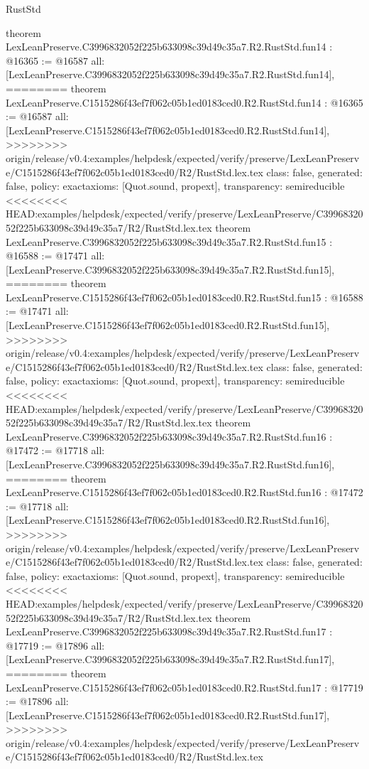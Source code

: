 \begin{lexlean}{RustStd}
\begin{coremodule}
{\begin{coremodule}
{{{{{{{{{{{{{{{{theorem LexLeanPreserve.C3996832052f225b633098c39d49c35a7.R2.RustStd.fun14 : @16365 := @16587 {
  all: [LexLeanPreserve.C3996832052f225b633098c39d49c35a7.R2.RustStd.fun14],
========
theorem LexLeanPreserve.C1515286f43ef7f062c05b1ed0183ced0.R2.RustStd.fun14 : @16365 := @16587 {
  all: [LexLeanPreserve.C1515286f43ef7f062c05b1ed0183ced0.R2.RustStd.fun14],
>>>>>>>> origin/release/v0.4:examples/helpdesk/expected/verify/preserve/LexLeanPreserve/C1515286f43ef7f062c05b1ed0183ced0/R2/RustStd.lex.tex
  class: false,
  generated: false,
  policy: exact{axioms: [Quot.sound, propext]},
  transparency: semireducible
}
<<<<<<<< HEAD:examples/helpdesk/expected/verify/preserve/LexLeanPreserve/C3996832052f225b633098c39d49c35a7/R2/RustStd.lex.tex
theorem LexLeanPreserve.C3996832052f225b633098c39d49c35a7.R2.RustStd.fun15 : @16588 := @17471 {
  all: [LexLeanPreserve.C3996832052f225b633098c39d49c35a7.R2.RustStd.fun15],
========
theorem LexLeanPreserve.C1515286f43ef7f062c05b1ed0183ced0.R2.RustStd.fun15 : @16588 := @17471 {
  all: [LexLeanPreserve.C1515286f43ef7f062c05b1ed0183ced0.R2.RustStd.fun15],
>>>>>>>> origin/release/v0.4:examples/helpdesk/expected/verify/preserve/LexLeanPreserve/C1515286f43ef7f062c05b1ed0183ced0/R2/RustStd.lex.tex
  class: false,
  generated: false,
  policy: exact{axioms: [Quot.sound, propext]},
  transparency: semireducible
}
<<<<<<<< HEAD:examples/helpdesk/expected/verify/preserve/LexLeanPreserve/C3996832052f225b633098c39d49c35a7/R2/RustStd.lex.tex
theorem LexLeanPreserve.C3996832052f225b633098c39d49c35a7.R2.RustStd.fun16 : @17472 := @17718 {
  all: [LexLeanPreserve.C3996832052f225b633098c39d49c35a7.R2.RustStd.fun16],
========
theorem LexLeanPreserve.C1515286f43ef7f062c05b1ed0183ced0.R2.RustStd.fun16 : @17472 := @17718 {
  all: [LexLeanPreserve.C1515286f43ef7f062c05b1ed0183ced0.R2.RustStd.fun16],
>>>>>>>> origin/release/v0.4:examples/helpdesk/expected/verify/preserve/LexLeanPreserve/C1515286f43ef7f062c05b1ed0183ced0/R2/RustStd.lex.tex
  class: false,
  generated: false,
  policy: exact{axioms: [Quot.sound, propext]},
  transparency: semireducible
}
<<<<<<<< HEAD:examples/helpdesk/expected/verify/preserve/LexLeanPreserve/C3996832052f225b633098c39d49c35a7/R2/RustStd.lex.tex
theorem LexLeanPreserve.C3996832052f225b633098c39d49c35a7.R2.RustStd.fun17 : @17719 := @17896 {
  all: [LexLeanPreserve.C3996832052f225b633098c39d49c35a7.R2.RustStd.fun17],
========
theorem LexLeanPreserve.C1515286f43ef7f062c05b1ed0183ced0.R2.RustStd.fun17 : @17719 := @17896 {
  all: [LexLeanPreserve.C1515286f43ef7f062c05b1ed0183ced0.R2.RustStd.fun17],
>>>>>>>> origin/release/v0.4:examples/helpdesk/expected/verify/preserve/LexLeanPreserve/C1515286f43ef7f062c05b1ed0183ced0/R2/RustStd.lex.tex
}}}}}}}}}}}}}}}}}}}}}
\end{coremodule}}
\end{coremodule}
\end{lexlean}
